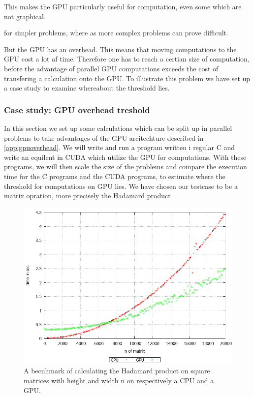 This makes the GPU particularly useful for computation, even some which are not graphical. %


for simpler problems, where as more complex problems can prove difficult.  

But the GPU has an overhead.
This means that moving computations to the GPU cost a lot af time.
Therefore one has to reach a certian size of computation, before the advantage of parallel GPU computations exceeds the cost of transfering a calculation onto the GPU.
To illustrate this problem we have set up a case study to examine whereabout the threshold lies. 

\subsubsection{Case study: GPU overhead treshold}
In this section we set up some calculations which can be split up in parallel problems to take advantages of the GPU arcitechture described in \ref{app:gpuoverhead}.
We will write and run a program written i regular C and write an equilent in CUDA which utilize the GPU for computations.
With these programs, we will then scale the size of the problems and compare the execution time for the C programs and the CUDA programs, to estimate where the threshold for computations on GPU lies.
We have chosen our testcase to be a matrix opration, more precisely the  Hadamard product

\begin{figure}[h!]
\centering
 \includegraphics[width=1\textwidth]{figures/benchmark.png} %
\caption{A becnhmark of calculating the Hadamard product on square matrices with height and width n on respectively a CPU and a GPU.}\label{image:benchmark}
\vspace{-15pt}
\end{figure}
